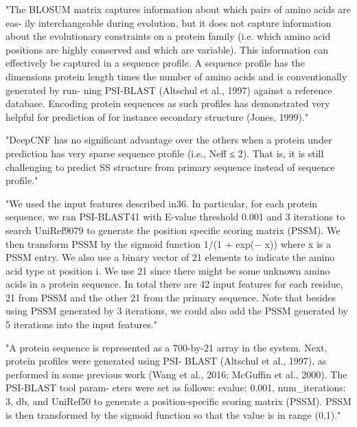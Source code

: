  "The BLOSUM matrix captures information about which pairs of amino acids are eas- ily interchangeable during evolution, but it does not capture information about the evolutionary constraints on a protein family (i.e. which amino acid positions are highly conserved and which are variable). This information can effectively be captured in a sequence profile. A sequence profile has the dimensions protein length times the number of amino acids and is conventionally generated by run- ning PSI-BLAST (Altschul et al., 1997) against a reference database. Encoding protein sequences as such profiles has demonstrated very helpful for prediction of for instance secondary structure (Jones, 1999)." \cite{Jurtz2017}

 "DeepCNF has no significant advantage over the others when a protein under prediction has very sparse sequence profile (i.e., Neff ≤ 2). That is, it is still challenging to predict SS structure from primary sequence instead of sequence profile." \cite{Wang2016}

 "We used the input features described in36. In particular, for each protein sequence, we ran PSI-BLAST41 with E-value threshold 0.001 and 3 iterations to search UniRef9079 to generate the position specific scoring matrix (PSSM). We then transform PSSM by the sigmoid function 1/(1 + exp(− x)) where x is a PSSM entry. We also use a binary vector of 21 elements to indicate the amino acid type at position i. We use 21 since there might be some unknown amino acids in a protein sequence. In total there are 42 input features for each residue, 21 from PSSM and the other 21 from the primary sequence. Note that besides using PSSM generated by 3 iterations, we could also add the PSSM generated by 5 iterations into the input features." \cite{Wang2016}

 "A protein sequence is represented as a 700-by-21 array in the system. Next, protein profiles were generated using PSI- BLAST (Altschul et al., 1997), as performed in some previous work (Wang et al., 2016; McGuffin et al., 2000). The PSI-BLAST tool param- eters were set as follows: evalue: 0.001, num\_iterations: 3, db, and UniRef50 to generate a position-specific scoring matrix (PSSM). PSSM is then transformed by the sigmoid function so that the value is in range (0,1)." \cite{Fang2017}

